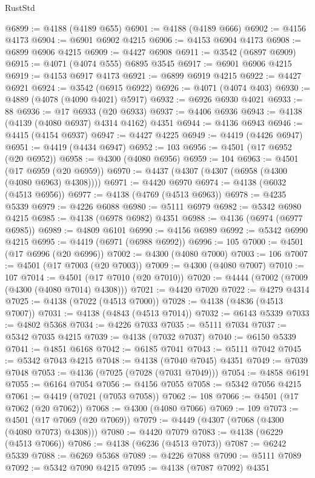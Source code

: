 \begin{lexlean}{RustStd}
\begin{coremodule}
@6899 := @4188 (@4189 @655)
@6901 := @4188 (@4189 @666)
@6902 := @4156 @4173
@6904 := @6901 @6902 @4215
@6906 := @4153 @6904 @4173
@6908 := @6899 @6906 @4215
@6909 := @4427 @6908
@6911 := @3542 (@6897 @6909)
@6915 := @4071 (@4074 @555) @6895 @3545
@6917 := @6901 @6906 @4215
@6919 := @4153 @6917 @4173
@6921 := @6899 @6919 @4215
@6922 := @4427 @6921
@6924 := @3542 (@6915 @6922)
@6926 := @4071 (@4074 @403)
@6930 := @4889 (@4078 (@4090 @4021) @5917)
@6932 := @6926 @6930 @4021
@6933 := 88
@6936 := @17 @6933 (@20 @6933)
@6937 := @4406 @6936
@6943 := @4138 (@4139 (@4080 @6937) @4314 @4162) @4351
@6944 := @4136 @6943
@6946 := @4415 (@4154 @6937)
@6947 := @4427 @4225
@6949 := @4419 (@4426 @6947)
@6951 := @4419 (@4434 @6947)
@6952 := 103
@6956 := @4501 (@17 @6952 (@20 @6952))
@6958 := @4300 (@4080 @6956)
@6959 := 104
@6963 := @4501 (@17 @6959 (@20 @6959))
@6970 := @4437 (@4307 (@4307 (@6958 (@4300 (@4080 @6963) @4308))))
@6971 := @4420 @6970
@6974 := @4138 (@6032 (@4513 @6956))
@6977 := @4138 (@4769 (@4513 @6963))
@6978 := @4235 @5339
@6979 := @4226 @6088
@6980 := @5111 @6979
@6982 := @5342 @6980 @4215
@6985 := @4138 (@6978 @6982) @4351
@6988 := @4136 (@6974 (@6977 @6985))
@6989 := @4809 @6101
@6990 := @4156 @6989
@6992 := @5342 @6990 @4215
@6995 := @4419 (@6971 (@6988 @6992))
@6996 := 105
@7000 := @4501 (@17 @6996 (@20 @6996))
@7002 := @4300 (@4080 @7000)
@7003 := 106
@7007 := @4501 (@17 @7003 (@20 @7003))
@7009 := @4300 (@4080 @7007)
@7010 := 107
@7014 := @4501 (@17 @7010 (@20 @7010))
@7020 := @4444 (@7002 (@7009 (@4300 (@4080 @7014) @4308)))
@7021 := @4420 @7020
@7022 := @4279 @4314
@7025 := @4138 (@7022 (@4513 @7000))
@7028 := @4138 (@4836 (@4513 @7007))
@7031 := @4138 (@4843 (@4513 @7014))
@7032 := @6143 @5339
@7033 := @4802 @5368
@7034 := @4226 @7033
@7035 := @5111 @7034
@7037 := @5342 @7035 @4215
@7039 := @4138 (@7032 @7037)
@7040 := @6150 @5339
@7041 := @4851 @6168
@7042 := @6185 @7041
@7043 := @5111 @7042
@7045 := @5342 @7043 @4215
@7048 := @4138 (@7040 @7045) @4351
@7049 := @7039 @7048
@7053 := @4136 (@7025 (@7028 (@7031 @7049)))
@7054 := @4858 @6191
@7055 := @6164 @7054
@7056 := @4156 @7055
@7058 := @5342 @7056 @4215
@7061 := @4419 (@7021 (@7053 @7058))
@7062 := 108
@7066 := @4501 (@17 @7062 (@20 @7062))
@7068 := @4300 (@4080 @7066)
@7069 := 109
@7073 := @4501 (@17 @7069 (@20 @7069))
@7079 := @4449 (@4307 (@7068 (@4300 (@4080 @7073) @4308)))
@7080 := @4420 @7079
@7083 := @4138 (@6229 (@4513 @7066))
@7086 := @4138 (@6236 (@4513 @7073))
@7087 := @6242 @5339
@7088 := @6269 @5368
@7089 := @4226 @7088
@7090 := @5111 @7089
@7092 := @5342 @7090 @4215
@7095 := @4138 (@7087 @7092) @4351

\end{coremodule}
\end{lexlean}
